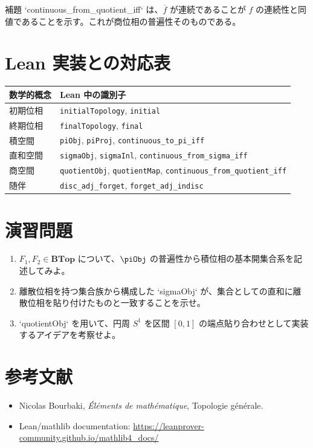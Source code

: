 \documentclass[]{jlreq}
\theoremstyle{definition}
\theoremstyle{remark}
\begin{document}
補題 `continuous_from_quotient_iff` は、$\overline{f}$ が連続であることが $f$ の連続性と同値であることを示す。これが商位相の普遍性そのものである。

\section{Lean 実装との対応表}
\begin{center}
\begin{tabular}{ll}
\hline
数学的概念 & Lean 中の識別子 \\
\hline
初期位相 & \texttt{initialTopology}, \texttt{initial} \\
終期位相 & \texttt{finalTopology}, \texttt{final} \\
積空間 & \texttt{piObj}, \texttt{piProj}, \texttt{continuous\_to\_pi\_iff} \\
直和空間 & \texttt{sigmaObj}, \texttt{sigmaInl}, \texttt{continuous\_from\_sigma\_iff} \\
商空間 & \texttt{quotientObj}, \texttt{quotientMap}, \texttt{continuous\_from\_quotient\_iff} \\
随伴 & \texttt{disc\_adj\_forget}, \texttt{forget\_adj\_indisc} \\
\hline
\end{tabular}
\end{center}

\section{演習問題}
\begin{enumerate}
  \item $F_1,F_2\in\mathbf{BTop}$ について、$\piObj$ の普遍性から積位相の基本開集合系を記述してみよ。
  \item 離散位相を持つ集合族から構成した `sigmaObj` が、集合としての直和に離散位相を貼り付けたものと一致することを示せ。
  \item `quotientObj` を用いて、円周 $S^1$ を区間 $[0,1]$ の端点貼り合わせとして実装するアイデアを考察せよ。
\end{enumerate}

\section{参考文献}
\begin{itemize}
  \item Nicolas Bourbaki, \textit{\'El\'ements de math\'ematique}, Topologie g\'en\'erale.
  \item Lean/mathlib documentation: \url{https://leanprover-community.github.io/mathlib4_docs/}
\end{itemize}
\end{document}
